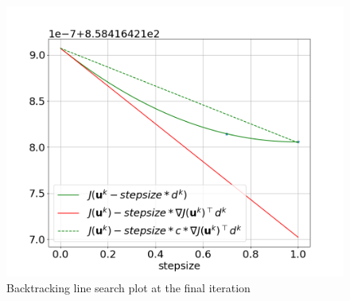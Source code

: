 \begin{figure}
    \centering
    \includegraphics[width=0.8\linewidth]{figs/downward_armijio_f_smooth.png}
    \caption{Backtracking line search plot at the final iteration}
    \label{fig:downward_armijio_f_smooth}
\end{figure}

